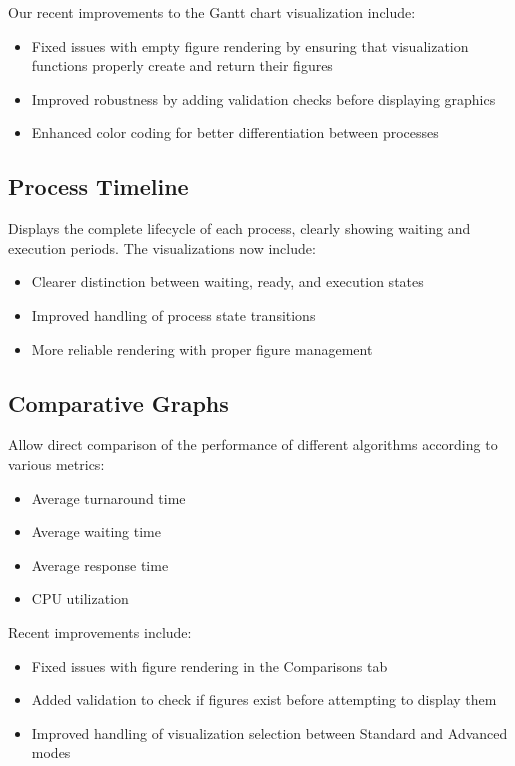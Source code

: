 \documentclass[12pt,a4paper]{article}
\begin{document}
Our recent improvements to the Gantt chart visualization include:
\begin{itemize}
    \item Fixed issues with empty figure rendering by ensuring that visualization functions properly create and return their figures
    \item Improved robustness by adding validation checks before displaying graphics
    \item Enhanced color coding for better differentiation between processes
\end{itemize}

\subsection{Process Timeline}
Displays the complete lifecycle of each process, clearly showing waiting and execution periods. The visualizations now include:
\begin{itemize}
    \item Clearer distinction between waiting, ready, and execution states
    \item Improved handling of process state transitions
    \item More reliable rendering with proper figure management
\end{itemize}

\subsection{Comparative Graphs}
Allow direct comparison of the performance of different algorithms according to various metrics:
\begin{itemize}
    \item Average turnaround time
    \item Average waiting time
    \item Average response time
    \item CPU utilization
\end{itemize}

Recent improvements include:
\begin{itemize}
    \item Fixed issues with figure rendering in the Comparisons tab
    \item Added validation to check if figures exist before attempting to display them
    \item Improved handling of visualization selection between Standard and Advanced modes
\end{itemize}
\end{document}
